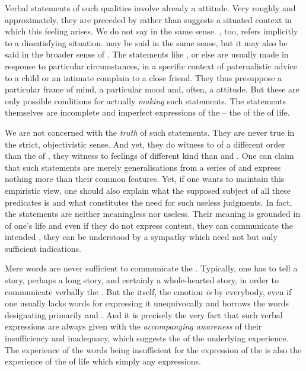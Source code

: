  Verbal statements of such qualities involve already a
 attitude.  Very roughly and approximately, they are preceded by
 rather than   suggests a
situated context in which this feeling arises. We do not say  in
the same sense.  , too, refers implicitly to a
dissatisfying situation.  may be said in the same sense,
but it may also be said in the broader sense of .
The statements like , or else
 are usually made in
response to particular circumstances, in a specific context of paternalistic
advice to a child or an intimate complain to a close friend. They thus
presuppose a particular frame of mind, a particular mood and, often, a
 attitude.  But these are only possible conditions for actually
{\em making} such statements. The statements themselves are incomplete and
imperfect expressions of the  -- the  of the
  of  life.

We are not concerned with the {\em truth} of such statements. They are never
true in the strict, objectivistic sense. And yet, they do witness to
 of a different order than the  of
, they witness to feelings of different kind than  and
.  One can claim that such statements are merely generalisations
from a series of  and express nothing more than their common
features. Yet, if one wants to maintain this empiristic view, one should also
explain what the supposed subject of all these predicates is and what
constitutes the need for such useless judgments. In fact, the statements are
neither meaningless nor useless. Their meaning is grounded in  of one's life and even if they do not express 
content, they can communicate the intended , they can be
understood by a sympathy which need not  but only
sufficient indications.


Mere words  are  never sufficient to communicate the
.  Typically, one has to tell a story, perhaps a long story,
and certainly a whole-hearted story, in order to communicate verbally the
.  But the  itself, the {emotion} {\em is}
 by everybody, even if one usually lacks words for expressing it
unequivocally and borrows the words designating primarily  and
.  And it is precisely the very fact that such verbal
expressions are always given with the {\em accompanying awareness} of their
insufficiency and inadequacy, which suggests the  of the underlying
experience. The experience of the words being insufficient for the expression of
the  is also the experience of the  of life which
simply  any  expressions.

